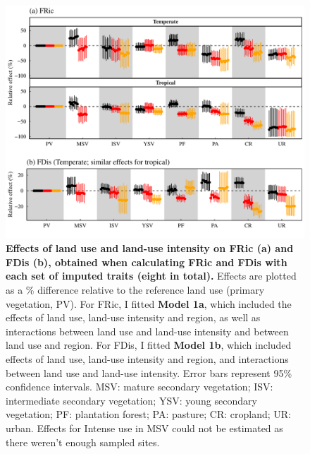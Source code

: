 \begin{figure}[h!]
\centering
\includegraphics[scale=0.7]{Supporting/Chapter3/Figures/Figure_SI_20}
\caption[Effects of land use and land-use intensity on FRic (a) and FDis (b), obtained when calculating FRic and FDis with each set of imputed traits]{\textbf{Effects of land use and land-use intensity on FRic (a) and FDis (b), obtained when calculating FRic and FDis with each set of imputed traits (eight in total).} Effects are plotted as a \% difference relative to the reference land use (primary vegetation, PV). For FRic, I fitted \textbf{Model 1a}, which included the effects of land use, land-use intensity and region, as well as interactions between land use and land-use intensity and between land use and region. For FDis, I fitted \textbf{Model 1b}, which included effects of land use, land-use intensity and region, and interactions between land use and land-use intensity. Error bars represent 95\% confidence intervals. MSV: mature secondary vegetation; ISV: intermediate secondary vegetation; YSV: young secondary vegetation; PF: plantation forest; PA: pasture; CR: cropland; UR: urban. Effects for Intense use in MSV could not be estimated as there weren’t enough sampled sites.}
\label{SI3_F20}
\end{figure}

